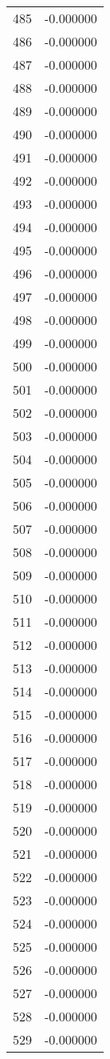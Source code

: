 \documentclass[12pt]{article}
\begin{document}
\begin{longtable}{@{}cc@{}}
485 & -0.000000 \\
486 & -0.000000 \\
487 & -0.000000 \\
488 & -0.000000 \\
489 & -0.000000 \\
490 & -0.000000 \\
491 & -0.000000 \\
492 & -0.000000 \\
493 & -0.000000 \\
494 & -0.000000 \\
495 & -0.000000 \\
496 & -0.000000 \\
497 & -0.000000 \\
498 & -0.000000 \\
499 & -0.000000 \\
500 & -0.000000 \\
501 & -0.000000 \\
502 & -0.000000 \\
503 & -0.000000 \\
504 & -0.000000 \\
505 & -0.000000 \\
506 & -0.000000 \\
507 & -0.000000 \\
508 & -0.000000 \\
509 & -0.000000 \\
510 & -0.000000 \\
511 & -0.000000 \\
512 & -0.000000 \\
513 & -0.000000 \\
514 & -0.000000 \\
515 & -0.000000 \\
516 & -0.000000 \\
517 & -0.000000 \\
518 & -0.000000 \\
519 & -0.000000 \\
520 & -0.000000 \\
521 & -0.000000 \\
522 & -0.000000 \\
523 & -0.000000 \\
524 & -0.000000 \\
525 & -0.000000 \\
526 & -0.000000 \\
527 & -0.000000 \\
528 & -0.000000 \\
529 & -0.000000 \\

\end{longtable}
\end{document}
